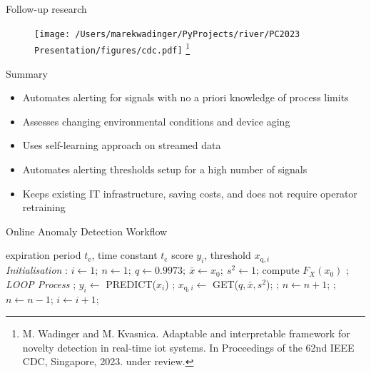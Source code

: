 \documentclass{beamer}
\newcommand{\ui}[2]{#1 _{\mathrm{#2}}}
\newcommand{\uis}[3]{#1 _{\mathrm{#2}, #3}}
\begin{document}
\begin{frame}{Follow-up research}
    \begin{figure}[htpb]
        \begin{center}
            \texttt{[image: /Users/marekwadinger/PyProjects/river/PC2023 Presentation/figures/cdc.pdf]}
            \footnote{\tiny M. Wadinger and M. Kvasnica. Adaptable and interpretable framework for novelty detection in real-time iot systems. In Proceedings of the 62nd IEEE CDC, Singapore, 2023. under review.}
        \end{center}
    \end{figure}
\end{frame}

\begin{frame}{Summary}
    \begin{itemize}
        \item Automates alerting for signals with no a priori knowledge of process limits
        \item Assesses changing environmental conditions and device aging
        \item Uses self-learning approach on streamed data
        \item Automates alerting thresholds setup for a high number of signals
        \item Keeps existing IT infrastructure, saving costs, and does not require operator retraining
    \end{itemize}
\end{frame}

\begin{frame}{Online Anomaly Detection Workflow}
    \begin{algorithmic}[1]
        \scriptsize
        \renewcommand{\algorithmicrequire}{\textbf{Input:}}
        \renewcommand{\algorithmicensure}{\textbf{Output:}}
        \REQUIRE expiration period $\ui{t}{e}$, time constant $\ui{t}{c}$
        \ENSURE  score $y_i$, threshold $\uis{x}{q}{i}$
        \\ \textit{Initialisation} :
        \STATE $i \leftarrow 1;~ n \leftarrow 1;~ q \leftarrow 0.9973;~ \bar x  \leftarrow x_0;~  s^2 \leftarrow 1$;
        \STATE compute $F_X(x_0)$ ;
        \\ \textit{LOOP Process}
        \LOOP
        ;
        \STATE $y_i \leftarrow$ PREDICT($x_i$) ;
        \STATE $\uis{x}{q}{i} \leftarrow$ GET($q, \bar x, s^2$);
        \IF {\eqref{case:normal} \OR \eqref{eq:update}}
        ;
        \STATE $n \leftarrow n + 1$;
        \FOR {$x_{i-\ui{t}{e}}$}
        \STATE {$\bar x$, $s^2 \leftarrow$ REVERT($x_{i-\ui{t}{e}}, \bar x, s^2, n$)};
        \STATE $n \leftarrow n - 1$;
        \ENDFOR
        \ENDIF
        \STATE $i \leftarrow i + 1$;
        \ENDLOOP
    \end{algorithmic}
\end{frame}
\end{document}
